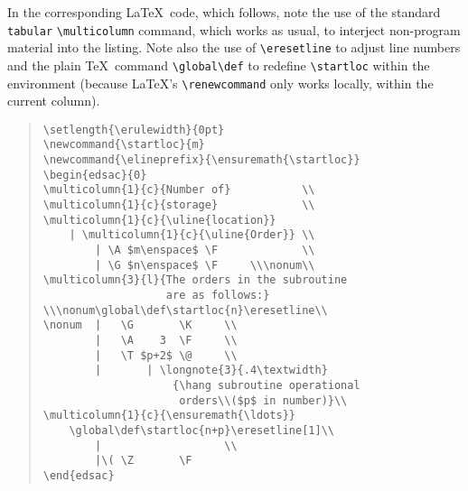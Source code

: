 \documentclass[11pt]{article}
\newcommand{\hang}{\leftskip=1em\parindent=-1em}
\begin{document}
In the corresponding \LaTeX\ code, which follows, note the use of the 
standard \texttt{tabular} \verb"\multicolumn" command, which works as
usual, to interject non-program material into the listing.  Note also
the use of \verb"\eresetline" to adjust line numbers and the plain
\TeX\ command \verb"\global\def" to redefine \verb"\startloc" within
the environment (because \LaTeX's \verb"\renewcommand" only works
locally, within the current column).
\begin{quote}\small
\begin{verbatim}
\setlength{\erulewidth}{0pt}
\newcommand{\startloc}{m}
\newcommand{\elineprefix}{\ensuremath{\startloc}}
\begin{edsac}{0}
\multicolumn{1}{c}{Number of}           \\
\multicolumn{1}{c}{storage}             \\
\multicolumn{1}{c}{\uline{location}}
    | \multicolumn{1}{c}{\uline{Order}} \\
        | \A $m\enspace$ \F             \\
        | \G $n\enspace$ \F     \\\nonum\\
\multicolumn{3}{l}{The orders in the subroutine
                   are as follows:}
\\\nonum\global\def\startloc{n}\eresetline\\
\nonum  |   \G       \K     \\
        |   \A    3  \F     \\
        |   \T $p+2$ \@     \\
        |       | \longnote{3}{.4\textwidth}
                    {\hang subroutine operational
                     orders\\($p$ in number)}\\
\multicolumn{1}{c}{\ensuremath{\ldots}}
    \global\def\startloc{n+p}\eresetline[1]\\
        |                   \\
        |\( \Z       \F
\end{edsac}
\end{verbatim}
\end{quote}
\end{document}
